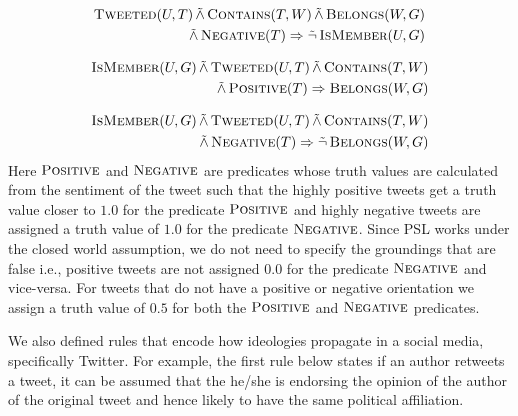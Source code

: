 \begin{align*}
\begin{split}
\textsc{Tweeted}(U,T)
	 \softand \textsc{Contains}(T,W)
	\softand \textsc{Belongs}(W,G)\\
	 \softand \textsc{Negative}(T)
	\Rightarrow \softneg \textsc{IsMember}(U,G)
\end{split}
\end{align*}

\begin{align*}
\begin{split}
\textsc{IsMember}(U,G)
	 \softand \textsc{Tweeted}(U,T)
	\softand \textsc{Contains}(T,W)\\
	 \softand \textsc{Positive}(T) 
	\Rightarrow \textsc{Belongs}(W,G)
\end{split}
\end{align*}

\begin{align*}
\begin{split}
\textsc{IsMember}(U,G) 
	\softand \textsc{Tweeted}(U,T)
	\softand \textsc{Contains}(T,W)\\
	\softand \textsc{Negative}(T)
	\Rightarrow \softneg \textsc{Belongs}(W,G)
\end{split}
\end{align*}
Here $\textsc{Positive}$ and $\textsc{Negative}$ are predicates whose truth values are calculated from the sentiment of the tweet such that the highly positive tweets get a truth value closer to $1.0$ for the predicate $\textsc{Positive}$ and highly negative tweets are assigned a truth value of $1.0$ for the predicate $\textsc{Negative}$. 
Since PSL works under the closed world assumption, we do not need to specify the groundings that are false i.e., positive tweets are not assigned $0.0$ for the predicate $\textsc{Negative}$ and vice-versa.
For tweets that do not have a positive or negative orientation we assign a truth value of $0.5$ for both the $\textsc{Positive}$ and $\textsc{Negative}$ predicates.


We also defined rules that encode how ideologies propagate in a social media, specifically Twitter.
For example, the first rule below states if an author retweets a tweet,  it can be assumed that the he/she is endorsing the opinion of the author of the original tweet and hence likely to have the same political affiliation. 
 
